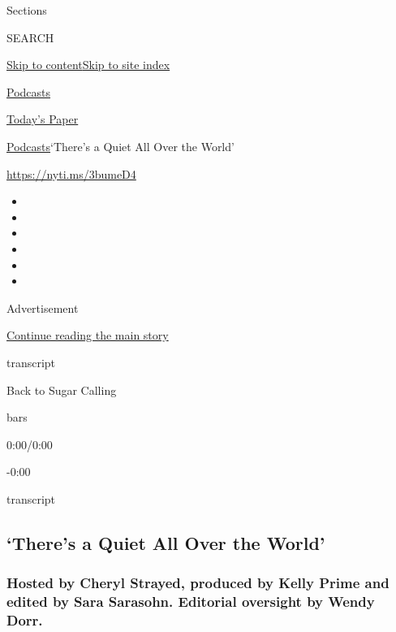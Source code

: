 Sections

SEARCH

\protect\hyperlink{site-content}{Skip to
content}\protect\hyperlink{site-index}{Skip to site index}

\href{https://www.nytimes3xbfgragh.onion/spotlight/podcasts}{Podcasts}

\href{https://myaccount.nytimes3xbfgragh.onion/auth/login?response_type=cookie\&client_id=vi}{}

\href{https://www.nytimes3xbfgragh.onion/section/todayspaper}{Today's
Paper}

\href{/spotlight/podcasts}{Podcasts}\textbar{}`There's a Quiet All Over
the World'

\href{https://nyti.ms/3bumeD4}{https://nyti.ms/3bumeD4}

\begin{itemize}
\item
\item
\item
\item
\item
\item
\end{itemize}

Advertisement

\protect\hyperlink{after-top}{Continue reading the main story}

transcript

Back to Sugar Calling

bars

0:00/0:00

-0:00

transcript

\hypertarget{theres-a-quiet-all-over-the-world}{%
\subsection{`There's a Quiet All Over the
World'}\label{theres-a-quiet-all-over-the-world}}

\hypertarget{hosted-by-cheryl-strayed-produced-by-kelly-prime-and-edited-by-sara-sarasohn-editorial-oversight-by-wendy-dorr}{%
\subsubsection{Hosted by Cheryl Strayed, produced by Kelly Prime and
edited by Sara Sarasohn. Editorial oversight by Wendy
Dorr.}\label{hosted-by-cheryl-strayed-produced-by-kelly-prime-and-edited-by-sara-sarasohn-editorial-oversight-by-wendy-dorr}}

